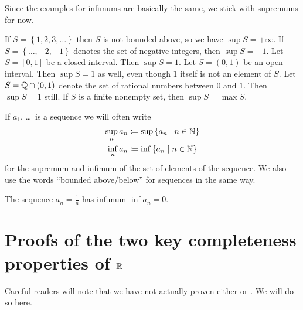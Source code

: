 \begin{example}
	[Supremums]
	Since the examples for infimums are basically the same,
	we stick with supremums for now.
	\begin{enumerate}[(a)]
		\ii If $S = \left\{ 1, 2, 3, \dots \right\}$
		then $S$ is not bounded above, so we have $\sup S = +\infty$.
		\ii If $S = \left\{ \dots, -2, -1 \right\}$
		denotes the set of negative integers, then $\sup S = -1$.
		\ii Let $S = [0,1]$ be a closed interval.
		Then $\sup S = 1$.
		\ii Let $S = (0,1)$ be an open interval.
		Then $\sup S = 1$ as well, even though $1$ itself
		is not an element of $S$.
		\ii Let $S = \mathbb Q \cap (0,1)$ denote the set of rational
		numbers between $0$ and $1$.
		Then $\sup S = 1$ still.
		\ii If $S$ is a finite nonempty set,
		then $\sup S = \max S$.
	\end{enumerate}
\end{example}

\begin{definition}
	If $a_1$, \dots\ is a sequence we will often write
	\begin{align*}
		\sup_n a_n &\coloneqq \sup \left\{ a_n \mid n \in \mathbb N \right\} \\
		\inf_n a_n &\coloneqq \inf \left\{ a_n \mid n \in \mathbb N \right\}
	\end{align*}
	for the supremum and infimum of the set of elements of the sequence.
	We also use the words ``bounded above/below'' for sequences
	in the same way.
\end{definition}
\begin{example}
	The sequence $a_n = \frac 1n$ has infimum $\inf a_n = 0$.
\end{example}

\section{Proofs of the two key completeness properties of $\mathbb R$}
Careful readers will note that we have not actually
proven either  or .
We will do so here.

